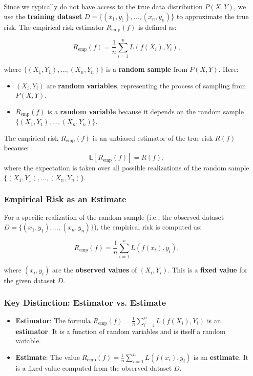 \begin{notechapter}
Since we typically do not have access to the true data distribution \( P(X, Y) \), we use the \textbf{training dataset} \( D = \{(x_1, y_1), \dots, (x_n, y_n)\} \) to approximate the true risk. The empirical risk estimator \( R_{\text{emp}}(f) \) is defined as:

\[
R_{\text{emp}}(f) = \frac{1}{n} \sum_{i=1}^n L(f(X_i), Y_i),
\]

where \( \{(X_1, Y_1), \dots, (X_n, Y_n)\} \) is a \textbf{random sample} from \( P(X, Y) \). Here:
\begin{itemize}
    \item \( (X_i, Y_i) \) are \textbf{random variables}, representing the process of sampling from \( P(X, Y) \).
    \item \( R_{\text{emp}}(f) \) is a \textbf{random variable} because it depends on the random sample \( \{(X_1, Y_1), \dots, (X_n, Y_n)\} \).
\end{itemize}

The empirical risk \( R_{\text{emp}}(f) \) is an unbiased estimator of the true risk \( R(f) \) because:
\[
\mathbb{E}[R_{\text{emp}}(f)] = R(f),
\]
where the expectation is taken over all possible realizations of the random sample \( \{(X_1, Y_1), \dots, (X_n, Y_n)\} \).

\subsubsection{Empirical Risk as an Estimate}

For a specific realization of the random sample (i.e., the observed dataset \( D = \{(x_1, y_1), \dots, (x_n, y_n)\} \)), the empirical risk is computed as:

\[
R_{\text{emp}}(f) = \frac{1}{n} \sum_{i=1}^n L(f(x_i), y_i),
\]

where \( (x_i, y_i) \) are the \textbf{observed values} of \( (X_i, Y_i) \). This is a \textbf{fixed value} for the given dataset \( D \).

\subsubsection{Key Distinction: Estimator vs. Estimate}

\begin{itemize}
    \item \textbf{Estimator}: The formula \( R_{\text{emp}}(f) = \frac{1}{n} \sum_{i=1}^n L(f(X_i), Y_i) \) is an \textbf{estimator}. It is a function of random variables and is itself a random variable.
    \item \textbf{Estimate}: The value \( R_{\text{emp}}(f) = \frac{1}{n} \sum_{i=1}^n L(f(x_i), y_i) \) is an \textbf{estimate}. It is a fixed value computed from the observed dataset \( D \).
\end{itemize}


\end{notechapter}
